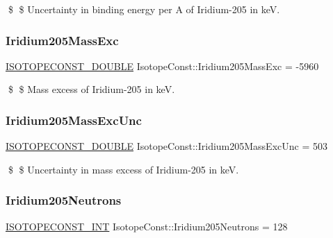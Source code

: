 \$ \$ Uncertainty in binding energy per A of Iridium-\/205 in keV. \mbox{\label{group___isotope_const-_iridium-_ir205_gae7576e2f92b76bbfbf774093eebd6cf1}} 
\subsubsection{\texorpdfstring{Iridium205\+Mass\+Exc}{Iridium205MassExc}}
{\footnotesize\ttfamily \mbox{\hyperlink{group___isotope_const-_macros_ga8f45a7272ce02c0b4c65c44636ed719a}{I\+S\+O\+T\+O\+P\+E\+C\+O\+N\+S\+T\+\_\+\+D\+O\+U\+B\+LE}} Isotope\+Const\+::\+Iridium205\+Mass\+Exc = -\/5960}

\$ \$ Mass excess of Iridium-\/205 in keV. \mbox{\label{group___isotope_const-_iridium-_ir205_ga6b782319e20778e9d7cfc91f230e55be}} 
\subsubsection{\texorpdfstring{Iridium205\+Mass\+Exc\+Unc}{Iridium205MassExcUnc}}
{\footnotesize\ttfamily \mbox{\hyperlink{group___isotope_const-_macros_ga8f45a7272ce02c0b4c65c44636ed719a}{I\+S\+O\+T\+O\+P\+E\+C\+O\+N\+S\+T\+\_\+\+D\+O\+U\+B\+LE}} Isotope\+Const\+::\+Iridium205\+Mass\+Exc\+Unc = 503}

\$ \$ Uncertainty in mass excess of Iridium-\/205 in keV. \mbox{\label{group___isotope_const-_iridium-_ir205_ga6d9b27a8fbcaf9d4f2429302e9d1a4ef}} 
\subsubsection{\texorpdfstring{Iridium205\+Neutrons}{Iridium205Neutrons}}
{\footnotesize\ttfamily \mbox{\hyperlink{group___isotope_const-_macros_ga5f18360b3e99483a35c32d789e62621c}{I\+S\+O\+T\+O\+P\+E\+C\+O\+N\+S\+T\+\_\+\+I\+NT}} Isotope\+Const\+::\+Iridium205\+Neutrons = 128}

